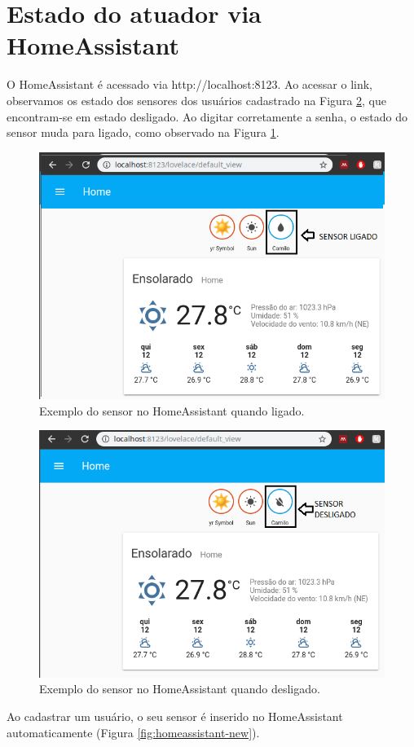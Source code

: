 \section{Estado do atuador via HomeAssistant}

O HomeAssistant é acessado via http://localhost:8123. Ao acessar o link, observamos os estado dos sensores dos usuários cadastrado na Figura \ref{fig:homeassistant-off}, que encontram-se em estado desligado. Ao digitar corretamente a senha, o estado do sensor muda para ligado, como observado na Figura \ref{fig:homeassistant-on}.

\begin{figure}[htbp]
	\centering
	\includegraphics[width=0.6\linewidth]{figuras/homeassistanton.png}
	\caption{Exemplo do sensor no HomeAssistant quando ligado.}
	\label{fig:homeassistant-on}
\end{figure}

\begin{figure}[htbp]
	\centering
	\includegraphics[width=0.6\linewidth]{figuras/homeassistantoff.png}
	\caption{Exemplo do sensor no HomeAssistant quando desligado.}
	\label{fig:homeassistant-off}
\end{figure}

Ao cadastrar um usuário, o seu sensor é inserido no HomeAssistant automaticamente (Figura \ref{fig:homeassistant-new}).

